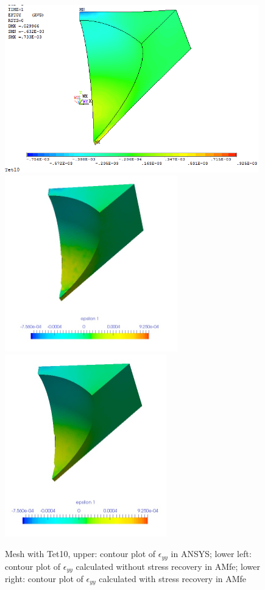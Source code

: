 \begin{figure}[htbp]
	\begin{center}
		\includegraphics[width=11cm,clip]{Tet10_Eyy.png} 	
		\includegraphics[width=7.5cm,clip]{Tet10_Eyy_PD.png} 		
		\includegraphics[width=7cm,clip]{Tet10_Eyy_P.png} 		
		\caption{Mesh with Tet10, upper: contour plot of $\epsilon_{yy}$ in ANSYS; lower left: contour plot of $\epsilon_{yy}$ calculated without stress recovery in AMfe; lower right: contour plot of $\epsilon_{yy}$ calculated with stress recovery in AMfe} \label{fig: Tet10_Eyy}
	\end{center}
\end{figure}
\clearpage 

